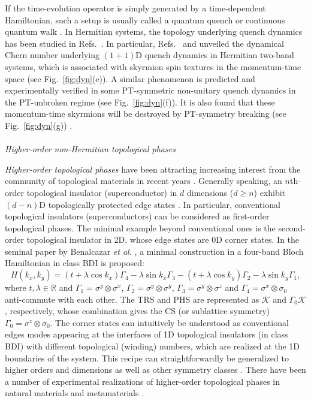 \documentclass{tADP2e}
\theoremstyle{plain}
\theoremstyle{plain}
\theoremstyle{definition}
\begin{document}
If the time-evolution operator is simply generated by a time-dependent Hamiltonian, such a setup is usually called a quantum quench \cite{ZL18c} or continuous quantum walk \cite{RMS09}. In Hermitian systems, the topology underlying quench dynamics has been studied in Refs.~\cite{CMD15,BJC16,WC17,LL18,GZ18,McM18,LZ18}. 
In particular, Refs.~\cite{LL18} and \cite{GZ18} unveiled the dynamical Chern number underlying 
 $(1+1)$D quench dynamics in Hermitian two-band systems, which is associated with skyrmion spin textures in the momentum-time space (see Fig.~\ref{fig:dyn}(e)). 
A similar phenomenon is predicted \cite{XQ19} and experimentally verified \cite{KW19} in some PT-symmetric non-unitary quench dynamics in the PT-unbroken regime (see Fig.~\ref{fig:dyn}(f)). It is also found that these momentum-time skyrmions will be destroyed by PT-symmetry breaking  (see Fig.~\ref{fig:dyn}(g)) \cite{XQ19,KW19}. 
\\ \\ {\it Higher-order non-Hermitian topological phases}

\vspace{3pt}
\noindent
\emph{Higher-order topological phases} have been attracting increasing interest from the community of topological materials in recent years \cite{BWA17,BWA17b,SZ17,LJ17,SF18,KE18b}. Generally speaking, an $n$th-order topological insulator (superconductor) in $d$ dimensions ($d\ge n$) exhibit $(d-n)$D topologically protected edge states \cite{LJ17,KE18b}. In particular, conventional topological insulators (superconductors) can be considered as first-order topological phases. The minimal example beyond conventional ones is the second-order topological insulator in 2D, whose edge states are 0D corner states. In the seminal paper by Benalcazar \emph{et al.} \cite{BWA17}, a minimal construction in a four-band Bloch Hamiltonian in class BDI is proposed:
\begin{equation}
H(k_x,k_y)=(t+\lambda\cos k_x)\Gamma_4-\lambda\sin k_x\Gamma_3-(t+\lambda\cos k_y)\Gamma_2-\lambda\sin k_y\Gamma_1, %
\label{SOH}
\end{equation} 
where $t,\lambda\in\mathbb{R}$ and $\Gamma_1=\sigma^y\otimes\sigma^x$, $\Gamma_2=\sigma^y\otimes\sigma^y$, $\Gamma_3=\sigma^y\otimes\sigma^z$ and $\Gamma_4=\sigma^x\otimes\sigma_0$ anti-commute with each other. The TRS and PHS are represented as $\mathcal{K}$ and $\Gamma_0\mathcal{K}$, respectively, whose combination gives the CS (or sublattice symmetry) $\Gamma_0=\sigma^z\otimes\sigma_0$. The corner states can intuitively be understood as conventional edges modes appearing at the interfaces of 1D topological insulators (in class BDI) with different topological (winding) numbers, which are realized at the 1D boundaries of the system. This recipe can straightforwardly be generalized to higher orders and dimensions as well as other symmetry classes \cite{LJ17,KE18b}. There have been a number of experimental realizations of higher-order topological phases in natural materials \cite{FSZW18,SNK19} and metamaterials \cite{MSG18,CWP18,SI18,HX18,XN18,AEH19,JHJ19}.
\end{document}
